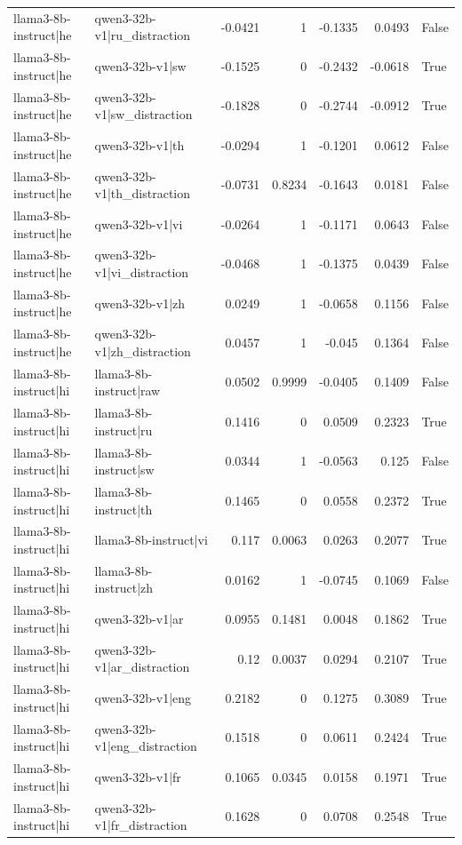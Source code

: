 \begin{table}
\begin{tabular}{l l r r r r l}
llama3-8b-instruct|he & qwen3-32b-v1|ru_distraction & -0.0421 & 1 & -0.1335 & 0.0493 & False \\
llama3-8b-instruct|he & qwen3-32b-v1|sw & -0.1525 & 0 & -0.2432 & -0.0618 & True \\
llama3-8b-instruct|he & qwen3-32b-v1|sw_distraction & -0.1828 & 0 & -0.2744 & -0.0912 & True \\
llama3-8b-instruct|he & qwen3-32b-v1|th & -0.0294 & 1 & -0.1201 & 0.0612 & False \\
llama3-8b-instruct|he & qwen3-32b-v1|th_distraction & -0.0731 & 0.8234 & -0.1643 & 0.0181 & False \\
llama3-8b-instruct|he & qwen3-32b-v1|vi & -0.0264 & 1 & -0.1171 & 0.0643 & False \\
llama3-8b-instruct|he & qwen3-32b-v1|vi_distraction & -0.0468 & 1 & -0.1375 & 0.0439 & False \\
llama3-8b-instruct|he & qwen3-32b-v1|zh & 0.0249 & 1 & -0.0658 & 0.1156 & False \\
llama3-8b-instruct|he & qwen3-32b-v1|zh_distraction & 0.0457 & 1 & -0.045 & 0.1364 & False \\
llama3-8b-instruct|hi & llama3-8b-instruct|raw & 0.0502 & 0.9999 & -0.0405 & 0.1409 & False \\
llama3-8b-instruct|hi & llama3-8b-instruct|ru & 0.1416 & 0 & 0.0509 & 0.2323 & True \\
llama3-8b-instruct|hi & llama3-8b-instruct|sw & 0.0344 & 1 & -0.0563 & 0.125 & False \\
llama3-8b-instruct|hi & llama3-8b-instruct|th & 0.1465 & 0 & 0.0558 & 0.2372 & True \\
llama3-8b-instruct|hi & llama3-8b-instruct|vi & 0.117 & 0.0063 & 0.0263 & 0.2077 & True \\
llama3-8b-instruct|hi & llama3-8b-instruct|zh & 0.0162 & 1 & -0.0745 & 0.1069 & False \\
llama3-8b-instruct|hi & qwen3-32b-v1|ar & 0.0955 & 0.1481 & 0.0048 & 0.1862 & True \\
llama3-8b-instruct|hi & qwen3-32b-v1|ar_distraction & 0.12 & 0.0037 & 0.0294 & 0.2107 & True \\
llama3-8b-instruct|hi & qwen3-32b-v1|eng & 0.2182 & 0 & 0.1275 & 0.3089 & True \\
llama3-8b-instruct|hi & qwen3-32b-v1|eng_distraction & 0.1518 & 0 & 0.0611 & 0.2424 & True \\
llama3-8b-instruct|hi & qwen3-32b-v1|fr & 0.1065 & 0.0345 & 0.0158 & 0.1971 & True \\
llama3-8b-instruct|hi & qwen3-32b-v1|fr_distraction & 0.1628 & 0 & 0.0708 & 0.2548 & True \\

\end{tabular}
\end{table}
